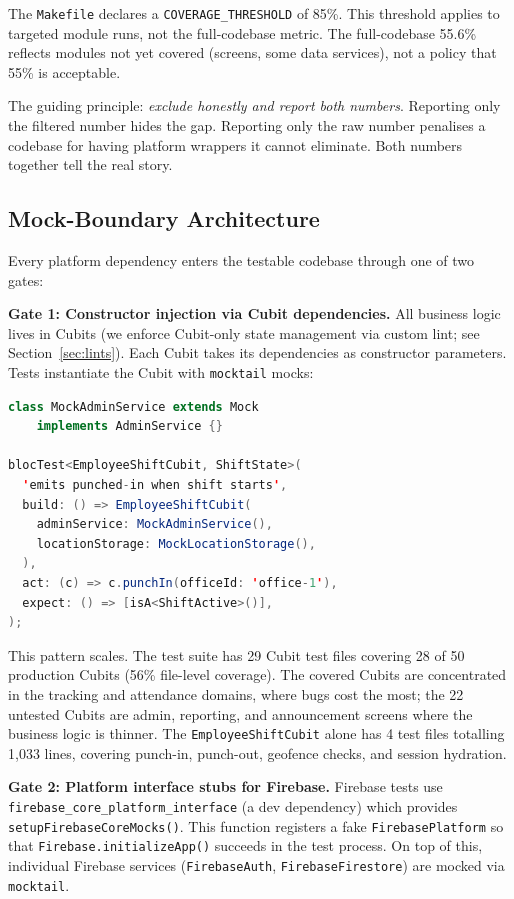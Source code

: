 \documentclass[10pt,journal,compsoc]{IEEEtran}
\begin{document}
The \texttt{Makefile} declares a \texttt{COVERAGE\_THRESHOLD} of 85\%.
This threshold applies to targeted module runs, not the full-codebase
metric. The full-codebase 55.6\% reflects modules not yet covered (screens,
some data services), not a policy that 55\% is acceptable.

The guiding principle: \emph{exclude honestly and report both numbers}.
Reporting only the filtered number hides the gap. Reporting only the raw
number penalises a codebase for having platform wrappers it cannot
eliminate. Both numbers together tell the real story.

\subsection{Mock-Boundary Architecture}
\label{sec:mocks}

Every platform dependency enters the testable codebase through one of two
gates:

\textbf{Gate 1: Constructor injection via Cubit dependencies.}
All business logic lives in Cubits (we enforce Cubit-only state management
via custom lint; see Section~\ref{sec:lints}). Each Cubit takes its
dependencies as constructor parameters. Tests instantiate the Cubit with
\texttt{mocktail} mocks:

\begin{lstlisting}[language=Java,caption={Typical Cubit test pattern}]
class MockAdminService extends Mock
    implements AdminService {}

blocTest<EmployeeShiftCubit, ShiftState>(
  'emits punched-in when shift starts',
  build: () => EmployeeShiftCubit(
    adminService: MockAdminService(),
    locationStorage: MockLocationStorage(),
  ),
  act: (c) => c.punchIn(officeId: 'office-1'),
  expect: () => [isA<ShiftActive>()],
);
\end{lstlisting}

This pattern scales. The test suite has 29 Cubit test files covering 28
of 50 production Cubits (56\% file-level coverage). The covered Cubits
are concentrated in the tracking and attendance domains, where bugs cost
the most; the 22 untested Cubits are admin, reporting, and announcement
screens where the business logic is thinner. The
\texttt{EmployeeShiftCubit} alone has 4 test files totalling 1,033 lines,
covering punch-in, punch-out, geofence checks, and session hydration.

\textbf{Gate 2: Platform interface stubs for Firebase.}
Firebase tests use \texttt{firebase\_core\_platform\_interface} (a dev
dependency) which provides \texttt{setupFirebaseCoreMocks()}. This
function registers a fake \texttt{FirebasePlatform} so that
\texttt{Firebase.initializeApp()} succeeds in the test process. On top of
this, individual Firebase services (\texttt{FirebaseAuth},
\texttt{FirebaseFirestore}) are mocked via \texttt{mocktail}.
\end{document}
